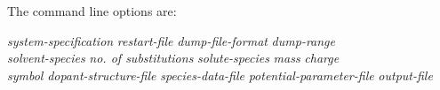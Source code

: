 \documentclass[a4paper,twoside]{report}
\begin{document}
The command line options are:
\begin{center}
\Lit{[-s} \textit{system-specification} \Lit{|}
 \textit{restart-file}\Lit{]}
\Lit{[-d} \textit{dump-file-format}\Lit{]}
\Lit{[-t} \textit{dump-range}\Lit{]} \\
\Lit{[-m} \textit{solvent-species}\Lit{]} 
\Lit{[-n} \textit{no. of substitutions}\Lit{]} 
\Lit{[-u} \textit{solute-species}\Lit{]}
\Lit{[-w} \textit{mass}\Lit{]} 
\Lit{[-q} \textit{charge}\Lit{]} \\
\Lit{[-z} \textit{symbol}\Lit{]}
\Lit{[-a} \textit{dopant-structure-file}\Lit{]}
\Lit{[-e} \textit{species-data-file}\Lit{]} 
\Lit{[-y} \textit{potential-parameter-file}\Lit{]} 
\Lit{[-x]}
\Lit{[-h]}
\Lit{[-k]}
\Lit{[-j]}
\Lit{[-c]}
\Lit{[-o} \textit{output-file}\Lit{]}
\end{center}
\end{document}
